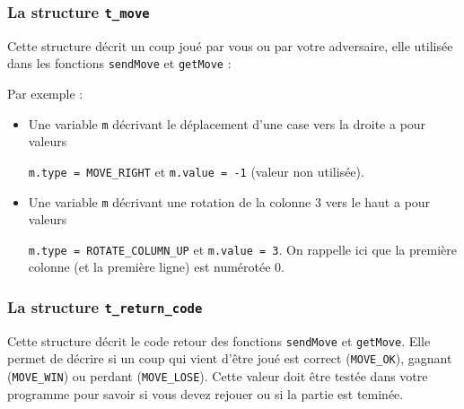 \documentclass[french,12pt,a4paper,twoside,openright,titlepage]{report}
\begin{document}
\subsubsection{La structure \texttt{t\_move}}
Cette structure décrit un coup joué par vous ou par votre adversaire, elle utilisée dans les fonctions  \verb|sendMove| et \verb|getMove| :

Par exemple :
\begin{itemize}
\item Une variable \verb|m| décrivant le déplacement d'une case vers la droite a pour valeurs

\verb|m.type = MOVE_RIGHT| et \verb|m.value = -1| (valeur non utilisée).
\item Une variable \verb|m| décrivant une rotation de la colonne 3 vers le haut a pour valeurs

\verb|m.type = ROTATE_COLUMN_UP| et  \verb|m.value = 3|. On rappelle ici que la première colonne
(et la première ligne) est numérotée 0.
\end{itemize}

\subsubsection{La structure \texttt{t\_return\_code}}
Cette structure décrit le code retour des fonctions \verb|sendMove| et \verb|getMove|. Elle permet de décrire si un coup qui vient d'être joué
est correct (\verb|MOVE_OK|), gagnant (\verb|MOVE_WIN|) ou perdant (\verb|MOVE_LOSE|). Cette valeur doit être testée
dans votre programme pour savoir si vous devez rejouer ou si la partie est teminée.

%
\end{document}
